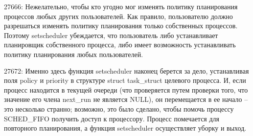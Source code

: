 27666: Нежелательно, чтобы кто угодно мог изменять политику планирования процессов любых других пользователей. Как правило, пользователю должно разрешаться изменять политику планирования только собственных процессов. Поэтому setscheduler убеждается, что пользователь либо устанавливает планировщик собственного процесса, либо имеет возможность устанавливать политику планирования любых пользователей.

27672: Именно здесь функция setscheduler наконец берется за дело, устанавливая поля policy и priority в структуре struct task\_struct целевого процесса. И, если процесс находится в текущей очереди (что проверяется путем проверки того, что значение его члена next\_run не является NULL), он перемещается в ее начало -- это несколько странно; возможно, это было сделано, чтобы помочь процессу SCHED\_FIFO получить доступ к процессору. Процесс помечается для повторного планирования, а функция setscheduler осуществляет уборку и выход.